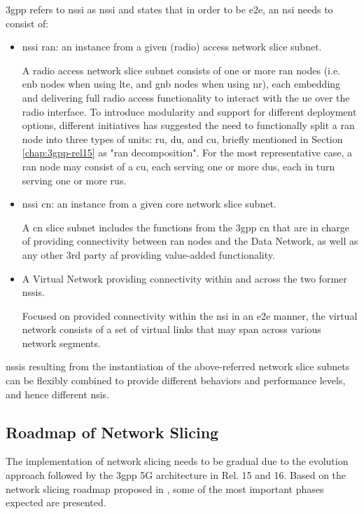 \newpage

\acrshort{3gpp} refers to \acrlong{nssi} as \acrshort{nssi} and states that in order to be \acrshort{e2e}, an \acrshort{nsi} needs to consist of:

\begin{itemize}
    \item  \acrshort{nssi} \acrshort{ran}: an instance from a given (radio) access network slice subnet.
    
    A radio access network slice subnet consists of one or more \acrshort{ran} nodes (i.e. \acrshort{enb} nodes when using \acrshort{lte}, and \acrshort{gnb} nodes when using \acrshort{nr}), each embedding and delivering full radio access functionality to interact with the \acrshort{ue} over the radio interface. To introduce modularity and support for different deployment options, different initiatives has suggested the need to functionally split a \acrshort{ran} node into three types of units: \acrfull{ru}, \acrfull{du}, and \acrfull{cu}, briefly mentioned in Section \ref{chap:3gpp-rel15} as "\acrshort{ran} decomposition". For the most representative case, a \acrshort{ran} node may consist of a \acrshort{cu}, each serving one or more \acrshort{du}s, each in turn serving one or more \acrshort{ru}s.
   
    \item \acrshort{nssi} \acrfull{cn}: an instance from a given core network slice subnet. 
    
    A \acrshort{cn} slice subnet includes the functions from the \acrshort{3gpp} \acrshort{cn} that are in charge of providing connectivity between \acrshort{ran} nodes and the Data Network, as well as any other 3rd party \acrshort{af} providing value-added functionality.
    \item A Virtual Network providing connectivity within and across the two former \acrshort{nssi}s. 
    
    Focused on provided connectivity within the \acrshort{nsi} in an \acrshort{e2e} manner, the virtual network consists of a set of virtual links that may span across various network segments.
\end{itemize}

\acrshort{nssi}s resulting from the instantiation of the above-referred network slice subnets can be flexibly combined to provide different behaviors and performance levels, and hence different \acrshort{nsi}s.


\subsection{Roadmap of Network Slicing}
The implementation of network slicing needs to be gradual due to the evolution approach followed by the \acrshort{3gpp} 5G architecture in Rel. 15 and 16. Based on the network slicing roadmap proposed in \cite{4G_LTE_E2E-NS}, some of the most important phases expected are presented.

